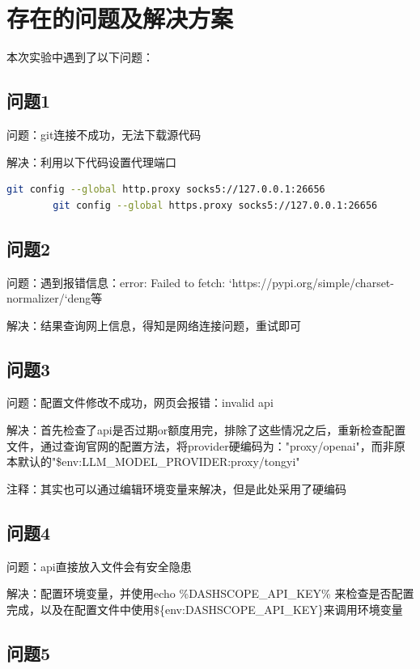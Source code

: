 \documentclass{article}
\begin{document}
	\section{存在的问题及解决方案}
	
	本次实验中遇到了以下问题：
	
	\subsection{问题1}
	
	问题：git连接不成功，无法下载源代码
	
	解决：利用以下代码设置代理端口
	
	\begin{lstlisting}[language=bash, title=uv安装, tabsize=4]
		git config --global http.proxy socks5://127.0.0.1:26656
		git config --global https.proxy socks5://127.0.0.1:26656
	\end{lstlisting}
	
	\subsection{问题2}
	
	问题：遇到报错信息：error: Failed to fetch: `https://pypi.org/simple/charset-normalizer/`deng等
	
	解决：结果查询网上信息，得知是网络连接问题，重试即可
	
	\subsection{问题3}
	
	问题：配置文件修改不成功，网页会报错：invalid api
	
	解决：首先检查了api是否过期or额度用完，排除了这些情况之后，重新检查配置文件，通过查询官网的配置方法，将provider硬编码为："proxy/openai"，而非原本默认的"\${env:LLM\_MODEL\_PROVIDER:proxy/tongyi}"
	
	注释：其实也可以通过编辑环境变量来解决，但是此处采用了硬编码
	
	\subsection{问题4}
	
	问题：api直接放入文件会有安全隐患
	
	解决：配置环境变量，并使用echo \%DASHSCOPE\_API\_KEY\% 来检查是否配置完成，以及在配置文件中使用\$\{env:DASHSCOPE\_API\_KEY\}来调用环境变量
	
	\subsection{问题5}
	
\end{document}
